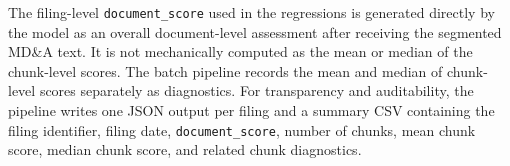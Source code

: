 The filing-level \texttt{document\_score} used in the regressions is generated directly by the model as an overall
document-level assessment after receiving the segmented MD\&A text. It is not mechanically computed as the mean
or median of the chunk-level scores. The batch pipeline records the mean and median of chunk-level scores separately
as diagnostics. For transparency and auditability, the pipeline writes one JSON output per filing and a summary CSV
containing the filing identifier, filing date, \texttt{document\_score}, number of chunks, mean chunk score, median chunk
score, and related chunk diagnostics.
